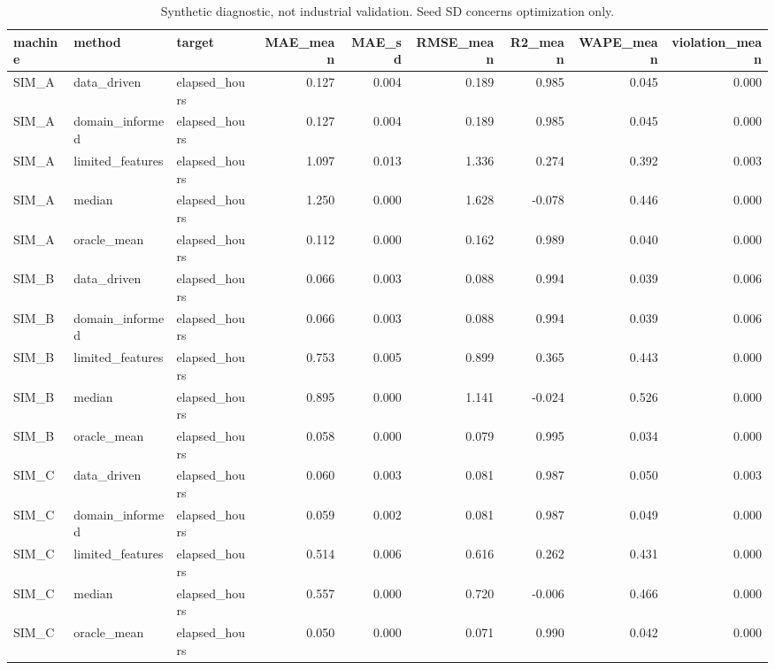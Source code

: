 \begin{table}
\caption{Synthetic diagnostic, not industrial validation. Seed SD concerns optimization only.}
\begin{tabular}{lllrrrrrr}
\toprule
machine & method & target & MAE\_mean & MAE\_sd & RMSE\_mean & R2\_mean & WAPE\_mean & violation\_mean \\
\midrule
SIM\_A & data\_driven & elapsed\_hours & 0.127 & 0.004 & 0.189 & 0.985 & 0.045 & 0.000 \\
SIM\_A & domain\_informed & elapsed\_hours & 0.127 & 0.004 & 0.189 & 0.985 & 0.045 & 0.000 \\
SIM\_A & limited\_features & elapsed\_hours & 1.097 & 0.013 & 1.336 & 0.274 & 0.392 & 0.003 \\
SIM\_A & median & elapsed\_hours & 1.250 & 0.000 & 1.628 & -0.078 & 0.446 & 0.000 \\
SIM\_A & oracle\_mean & elapsed\_hours & 0.112 & 0.000 & 0.162 & 0.989 & 0.040 & 0.000 \\
SIM\_B & data\_driven & elapsed\_hours & 0.066 & 0.003 & 0.088 & 0.994 & 0.039 & 0.006 \\
SIM\_B & domain\_informed & elapsed\_hours & 0.066 & 0.003 & 0.088 & 0.994 & 0.039 & 0.006 \\
SIM\_B & limited\_features & elapsed\_hours & 0.753 & 0.005 & 0.899 & 0.365 & 0.443 & 0.000 \\
SIM\_B & median & elapsed\_hours & 0.895 & 0.000 & 1.141 & -0.024 & 0.526 & 0.000 \\
SIM\_B & oracle\_mean & elapsed\_hours & 0.058 & 0.000 & 0.079 & 0.995 & 0.034 & 0.000 \\
SIM\_C & data\_driven & elapsed\_hours & 0.060 & 0.003 & 0.081 & 0.987 & 0.050 & 0.003 \\
SIM\_C & domain\_informed & elapsed\_hours & 0.059 & 0.002 & 0.081 & 0.987 & 0.049 & 0.000 \\
SIM\_C & limited\_features & elapsed\_hours & 0.514 & 0.006 & 0.616 & 0.262 & 0.431 & 0.000 \\
SIM\_C & median & elapsed\_hours & 0.557 & 0.000 & 0.720 & -0.006 & 0.466 & 0.000 \\
SIM\_C & oracle\_mean & elapsed\_hours & 0.050 & 0.000 & 0.071 & 0.990 & 0.042 & 0.000 \\
\bottomrule
\end{tabular}
\end{table}
